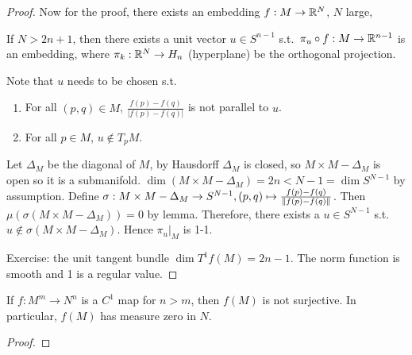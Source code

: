 \documentclass[12pt,class=article,crop=false]{standalone}
\begin{document}
\begin{proof}
Now for the proof, there exists an embedding $ f: M \to \mathbb{R}^{N}$, $ N$ large, 
 \begin{claim}
If $ N > 2n+1$, then there exists a unit vector  $  u \in S^{n-1}$ s.t.\ $ \pi_u \circ f: M \to \mathbb{R}^{n-1}$ is an embedding, where $ \pi_k: \mathbb{R}^{N} \to H_n$ (hyperplane) be the orthogonal projection.
\end{claim}
Note that $ u$ needs to be chosen  s.t.\ 
\begin{enumerate}[label=(\arabic*)]
	\item For all $ (p,q) \in M$, $ \frac{ f(p) - f(q)}{|f(p)-f(q)| } $ is not parallel to $ u$.
	\item For all  $ p \in M$, $ u \not\in T_pM$.
\end{enumerate}
Let $ \Delta_M$ be the diagonal of $ M$, by Hausdorff  $ \Delta_M$ is closed, so $ M\times M - \Delta_M$ is open so it is a submanifold. $ \dim (M \times M - \Delta_M) = 2n < N-1 = \dim S^{N-1}$ by assumption.  Define $ \sigma: M \times M - \Delta_M \to S^{N-1}, (p,q) \mapsto \frac{f(p)-f(q)}{ {\left\lVert{ f(p)-f(q)}\right\rVert} }$. Then $ \mu( \sigma(M \times M - \Delta_M)) = 0$ by lemma. Therefore, there exists a $ u \in S^{N-1}$ s.t.\  $ u \not\in \sigma(M \times M- \Delta_M)$. Hence $ \pi_u|_M$ is 1-1.

Exercise: the unit tangent bundle $ \dim T^{1}f(M) = 2n-1$. The norm function is smooth and 1 is a regular value. 
\end{proof}

\begin{lem}
If $ f: M^{m} \to N^{n}$ is a $ C^{1}$ map for $ n>m$, then $ f(M)$ is not surjective. In particular, $ f(M)$ has measure zero in $ N$.
\end{lem}

\begin{proof}

\end{proof}
\end{document}
